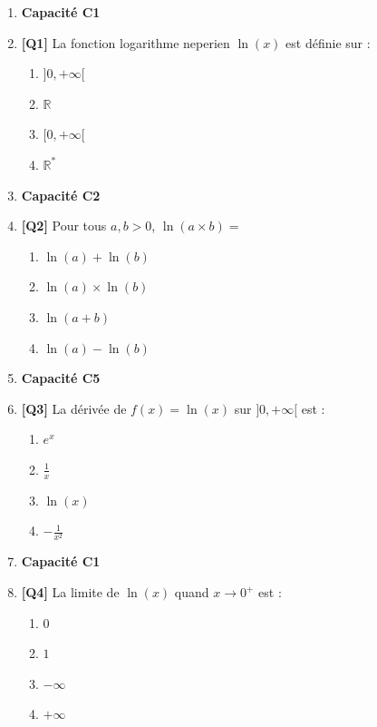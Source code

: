 \begin{enumerate}

\item[] \textbf{Capacité C1}

\item \textbf{[Q1]} La fonction logarithme neperien $\ln(x)$ est définie sur :
  \begin{enumerate}[label=\Alph*.]
    \item $]0, +\infty[$
    \item $\mathbb{R}$
    \item $[0, +\infty[$
    \item $\mathbb{R}^*$
  \end{enumerate}

\item[] \textbf{Capacité C2}

\item \textbf{[Q2]} Pour tous $a,b > 0$, $\ln(a \times b) =$
  \begin{enumerate}[label=\Alph*.]
    \item $\ln(a) + \ln(b)$
    \item $\ln(a) \times \ln(b)$
    \item $\ln(a+b)$
    \item $\ln(a) - \ln(b)$
  \end{enumerate}

\item[] \textbf{Capacité C5}

\item \textbf{[Q3]} La dérivée de $f(x) = \ln(x)$ sur $]0, +\infty[$ est :
  \begin{enumerate}[label=\Alph*.]
    \item $e^x$
    \item $\frac{1}{x}$
    \item $\ln(x)$
    \item $-\frac{1}{x^2}$
  \end{enumerate}

\item[] \textbf{Capacité C1}

\item \textbf{[Q4]} La limite de $\ln(x)$ quand $x \to 0^+$ est :
  \begin{enumerate}[label=\Alph*.]
    \item $0$
    \item $1$
    \item $-\infty$
    \item $+\infty$
  \end{enumerate}


\end{enumerate}
